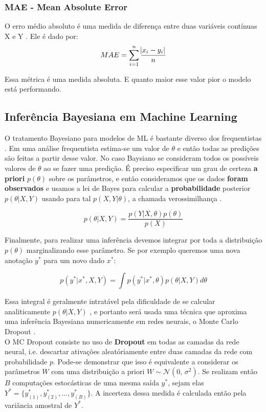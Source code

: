\subsubsection{MAE - Mean Absolute Error}

O erro médio absoluto é uma medida de diferença entre duas variáveis contínuas
X e Y \citep{cohen}. Ele é dado por: \\

\[MAE = \sum^n_{i=1}\frac{\abs{x_i - y_i}}{n}\]

Essa métrica é uma medida absoluta. E quanto maior esse valor pior o modelo está performando.


\subsection{Inferência Bayesiana em Machine Learning}

O tratamento Bayesiano para modelos de ML é bastante diverso dos frequentistas \citep{dlbook}.
Em uma análise frequentista estima-se um valor de $\theta$ e então todas as
predições são feitas a partir desse valor. No caso Baysiano se consideram todos
os possíveis valores de $\theta$ ao se fazer uma predição. É preciso especificar
um grau de certeza \textbf{a priori} $p(\theta)$ sobre os parâmetros, e então
consideramos que os dados \textbf{foram observados} e usamos a lei de Bayes para
calcular a \textbf{probabilidade} posterior $p(\theta | X,Y)$ usando para tal
$p(X,Y | \theta)$, a chamada verossimilhança \citep{bayesml}. 

\[    p(\theta | X,Y) = \frac{p(Y| X,\theta) p(\theta)}{p(X)}   \]

Finalmente, para realizar uma inferência devemos integrar por toda a distribuição $p(\theta)$ marginalizando esse parâmetro. Se por exemplo queremos uma nova anotação $y^*$ para um novo dado $x^*$:

\[ p(y^* | x^* , X,Y) = \int  p(y^* | x^*,\theta) p(\theta | X,Y)  d\theta \]

Essa integral é geralmente intratável pela dificuldade de se calcular
analiticamente $p(\theta | X,Y)$ \citep{ubertime}, e portanto será usada uma
técnica que aproxima uma inferência Bayesiana numericamente em redes neurais, o Monte Carlo
Dropout \citep{dropbayes}. \\

%

O MC Dropout consiste no uso de \textbf{Dropout} em todas as camadas da rede
neural, i.e. descartar ativações aleatóriamente entre duas camadas da rede com
probabilidade $p$. Pode-se demonstrar que isso é equivalente a considerar os
parâmetros $W$ com uma distribuição a priori $W \sim \mathcal{N}(0,\,\sigma^2)$. Se realizam então $B$ computações estocásticas de uma mesma
saída $y^*$, sejam elas $Y^* = \{y^*_{(1)},y^*_{(2)}, \dots , y^*_{(B)}\}$. A incerteza
  dessa medida é calculada então pela variância amostral de $Y^*$.

